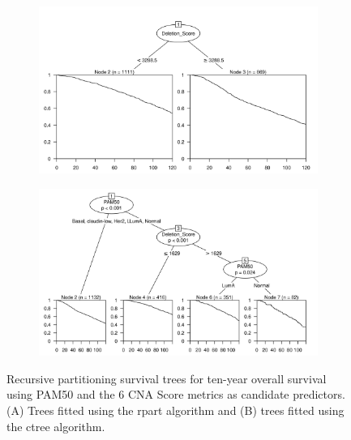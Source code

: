 \begin{figure}[!htb]
\centering

\vspace{0.5cm}

\begin{subfigure}{\textwidth}
\subcaption{}
\includegraphics[width=1\textwidth]{../figures/Appendices/Appendix_B/PartyKit_Survival_Score_TenYearOS_PAM50.png}
\end{subfigure}

\vspace{2cm}

\begin{subfigure}{\textwidth}
\subcaption{}
\includegraphics[width=1\textwidth]{../figures/Appendices/Appendix_B/Ctree_Survival_Score_TenYearOS_PAM50.png}
\end{subfigure}

\vspace{0.5cm}

\caption[Recursive partitioning survival trees for ten-year overall survival using PAM50 and the 6 CNA Score metrics as candidate predictors.]{Recursive partitioning survival trees for ten-year overall survival using PAM50 and the 6 CNA Score metrics as candidate predictors. (A) Trees fitted using the rpart algorithm and (B) trees fitted using the ctree algorithm.}
\end{figure}

